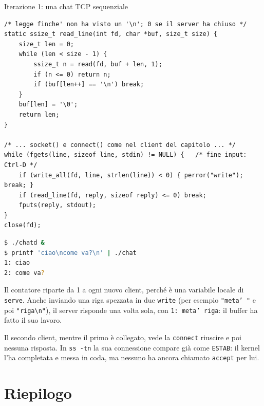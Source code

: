 \begin{esercizio}{Iterazione 1: una chat TCP sequenziale}
\begin{lstlisting}[language={[POSIX]C}, style=wnumbers, title={chat.c: il ciclo principale}]
/* legge finche' non ha visto un '\n'; 0 se il server ha chiuso */
static ssize_t read_line(int fd, char *buf, size_t size) {
    size_t len = 0;
    while (len < size - 1) {
        ssize_t n = read(fd, buf + len, 1);
        if (n <= 0) return n;
        if (buf[len++] == '\n') break;
    }
    buf[len] = '\0';
    return len;
}

/* ... socket() e connect() come nel client del capitolo ... */
while (fgets(line, sizeof line, stdin) != NULL) {   /* fine input: Ctrl-D */
    if (write_all(fd, line, strlen(line)) < 0) { perror("write"); break; }
    if (read_line(fd, reply, sizeof reply) <= 0) break;
    fputs(reply, stdout);
}
close(fd);
\end{lstlisting}

\begin{lstlisting}[language=bash, title={Una prova}]
$ ./chatd &
$ printf 'ciao\ncome va?\n' | ./chat
1: ciao
2: come va?
\end{lstlisting}

Il contatore riparte da 1 a ogni nuovo client, perché è una variabile locale di \texttt{serve}. Anche inviando una riga
spezzata in due \texttt{write} (per esempio \texttt{"meta' "} e poi \texttt{"riga\textbackslash n"}), il server
risponde una volta sola, con \texttt{1: meta' riga}: il buffer ha fatto il suo lavoro.

Il secondo client, mentre il primo è collegato, vede la \texttt{connect} riuscire e poi nessuna risposta. In
\texttt{ss -tn} la sua connessione compare già come \texttt{ESTAB}: il kernel l'ha completata e messa in coda, ma
nessuno ha ancora chiamato \texttt{accept} per lui.
\end{esercizio}


\section{Riepilogo}

